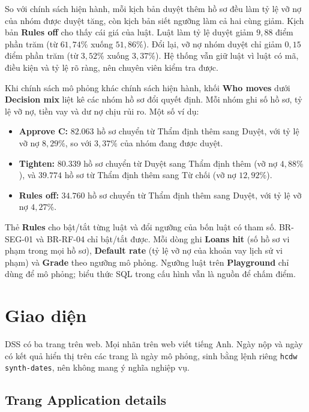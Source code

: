So với chính sách hiện hành, mỗi kịch bản duyệt thêm hồ sơ đều làm tỷ lệ vỡ nợ của nhóm được duyệt tăng, còn kịch bản siết ngưỡng làm cả hai cùng giảm. Kịch bản \textbf{Rules off} cho thấy cái giá của luật. Luật làm tỷ lệ duyệt giảm $9{,}88$ điểm phần trăm (từ $61{,}74\%$ xuống $51{,}86\%$). Đổi lại, vỡ nợ nhóm duyệt chỉ giảm $0{,}15$ điểm phần trăm (từ $3{,}52\%$ xuống $3{,}37\%$). Hệ thống vẫn giữ luật vì luật có mã, điều kiện và tỷ lệ rõ ràng, nên chuyên viên kiểm tra được.

\medskip

Khi chính sách mô phỏng khác chính sách hiện hành, khối \textbf{Who moves} dưới \textbf{Decision mix} liệt kê các nhóm hồ sơ đổi quyết định. Mỗi nhóm ghi số hồ sơ, tỷ lệ vỡ nợ, tiền vay và dư nợ chịu rủi ro. Một số ví dụ:
\begin{itemize}[topsep=0pt, itemsep=1pt]
	\item \textbf{Approve C:} $82.063$ hồ sơ chuyển từ Thẩm định thêm sang Duyệt, với tỷ lệ vỡ nợ $8{,}29\%$, so với $3{,}37\%$ của nhóm đang được duyệt.
	\item \textbf{Tighten:} $80.339$ hồ sơ chuyển từ Duyệt sang Thẩm định thêm (vỡ nợ $4{,}88\%$), và $39.774$ hồ sơ từ Thẩm định thêm sang Từ chối (vỡ nợ $12{,}92\%$).
	\item \textbf{Rules off:} $34.760$ hồ sơ chuyển từ Thẩm định thêm sang Duyệt, với tỷ lệ vỡ nợ $4{,}27\%$.
\end{itemize}

Thẻ \textbf{Rules} cho bật/tắt từng luật và đổi ngưỡng của bốn luật có tham số. BR-SEG-01 và BR-RF-04 chỉ bật/tắt được. Mỗi dòng ghi \textbf{Loans hit} (số hồ sơ vi phạm trong mọi hồ sơ), \textbf{Default rate} (tỷ lệ vỡ nợ của khoản vay lịch sử vi phạm) và \textbf{Grade} theo ngưỡng mô phỏng. Ngưỡng luật trên \textbf{Playground} chỉ dùng để mô phỏng; biểu thức SQL trong cấu hình vẫn là nguồn để chấm điểm.

\section{Giao diện}
\label{sec:dss-ui}

DSS có ba trang trên web. Mọi nhãn trên web viết tiếng Anh. Ngày nộp và ngày có kết quả hiển thị trên các trang là ngày mô phỏng, sinh bằng lệnh riêng \texttt{hcdw synth-dates}, nên không mang ý nghĩa nghiệp vụ.

\subsection{Trang Application details}
\label{sec:dss-ui-application}

